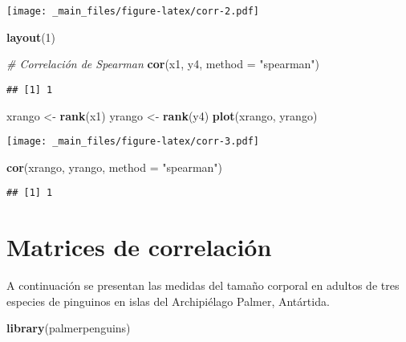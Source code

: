 \documentclass[
]{book}
\newenvironment{Shaded}{\begin{snugshade}}{\end{snugshade}}
\newcommand{\CommentTok}[1]{\textcolor[rgb]{0.56,0.35,0.01}{\textit{#1}}}
\newcommand{\DataTypeTok}[1]{\textcolor[rgb]{0.13,0.29,0.53}{#1}}
\newcommand{\DecValTok}[1]{\textcolor[rgb]{0.00,0.00,0.81}{#1}}
\newcommand{\KeywordTok}[1]{\textcolor[rgb]{0.13,0.29,0.53}{\textbf{#1}}}
\newcommand{\NormalTok}[1]{#1}
\newcommand{\StringTok}[1]{\textcolor[rgb]{0.31,0.60,0.02}{#1}}
\begin{document}
\texttt{[image: \_main\_files/figure-latex/corr-2.pdf]}

\begin{Shaded}
\begin{Highlighting}[]
\KeywordTok{layout}\NormalTok{(}\DecValTok{1}\NormalTok{)}

\CommentTok{# Correlación de Spearman}
\KeywordTok{cor}\NormalTok{(x1, y4, }\DataTypeTok{method =} \StringTok{"spearman"}\NormalTok{)}
\end{Highlighting}
\end{Shaded}

\begin{verbatim}
## [1] 1
\end{verbatim}

\begin{Shaded}
\begin{Highlighting}[]
\NormalTok{xrango <-}\StringTok{ }\KeywordTok{rank}\NormalTok{(x1) }
\NormalTok{yrango <-}\StringTok{ }\KeywordTok{rank}\NormalTok{(y4)}
\KeywordTok{plot}\NormalTok{(xrango, yrango)}
\end{Highlighting}
\end{Shaded}

\texttt{[image: \_main\_files/figure-latex/corr-3.pdf]}

\begin{Shaded}
\begin{Highlighting}[]
\KeywordTok{cor}\NormalTok{(xrango, yrango, }\DataTypeTok{method =} \StringTok{"spearman"}\NormalTok{)}
\end{Highlighting}
\end{Shaded}

\begin{verbatim}
## [1] 1
\end{verbatim}

\hypertarget{matrices-de-correlaciuxf3n}{%
\section{Matrices de correlación}\label{matrices-de-correlaciuxf3n}}

A continuación se presentan las medidas del tamaño corporal en adultos de tres especies de pinguinos en islas del Archipiélago Palmer, Antártida.

\begin{Shaded}
\begin{Highlighting}[]
\KeywordTok{library}\NormalTok{(palmerpenguins)}
\end{Highlighting}
\end{Shaded}
\end{document}

